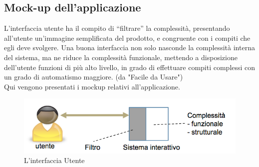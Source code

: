 \subsection{Mock-up dell'applicazione}
    \begin{flushleft}
       
        L'interfaccia utente  ha il compito di “filtrare” la complessità, presentando all'utente un'immagine semplificata del prodotto, e congruente con i compiti che egli deve
        svolgere. Una buona interfaccia non solo nasconde la complessità interna del sistema, ma ne riduce la
        complessità funzionale, mettendo a disposizione dell'utente funzioni di più alto livello, in grado di effettuare compiti
        complessi con un grado di automatismo maggiore. (da "Facile da Usare")\\
        Qui vengono presentati i mockup relativi all'applicazione.

         \begin{figure}[H]
          \centering
          \includegraphics[scale=0.5]{assets/immagini varie/interfaccia utente.png}
          \caption{L'interfaccia Utente}\label{fig:interfaccia utente}
        \end{figure}

    \end{flushleft}

